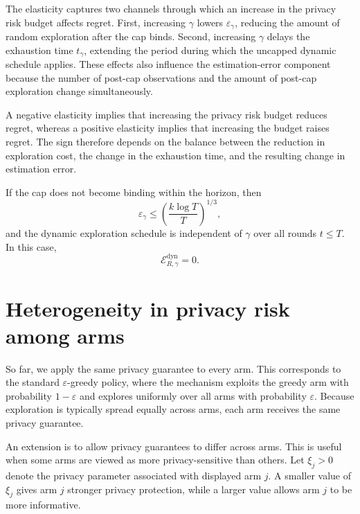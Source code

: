 \documentclass[mksc,nonblindrev]{informs3}
\begin{document}
\begin{APPENDICES}
The elasticity captures two channels through which an increase in the privacy risk budget affects regret. First, increasing \(\gamma\) lowers \(\varepsilon_\gamma\), reducing the amount of random exploration after the cap binds. Second, increasing \(\gamma\) delays the exhaustion time \(t_\gamma\), extending the period during which the uncapped dynamic schedule applies. These effects also influence the estimation-error component because the number of post-cap observations and the amount of post-cap exploration change simultaneously.

A negative elasticity implies that increasing the privacy risk budget reduces regret, whereas a positive elasticity implies that increasing the budget raises regret. The sign therefore depends on the balance between the reduction in exploration cost, the change in the exhaustion time, and the resulting change in estimation error.

If the cap does not become binding within the horizon, then
\[
\varepsilon_\gamma
\leq
\left(\frac{k\log T}{T}\right)^{1/3},
\]
and the dynamic exploration schedule is independent of \(\gamma\) over all rounds \(t\leq T\). In this case,
\begin{equation}
\mathcal{E}^{\mathrm{dyn}}_{R,\gamma}=0.
\end{equation}

\section{Heterogeneity in privacy risk among arms}\label{app:heterogeneity}
So far, we apply the same privacy guarantee to every arm. This corresponds to the standard $\varepsilon$-greedy policy, where the mechanism exploits the greedy arm with probability $1-\varepsilon$ and explores uniformly over all arms with probability $\varepsilon$. Because exploration is typically spread equally across arms, each arm receives the same privacy guarantee.

An extension is to allow privacy guarantees to differ across arms. This is useful when some arms are viewed as more privacy-sensitive than others. Let $\xi_j>0$ denote the privacy parameter associated with displayed arm $j$. A smaller value of $\xi_j$ gives arm $j$ stronger privacy protection, while a larger value allows arm $j$ to be more informative.


\end{APPENDICES}
\end{document}
